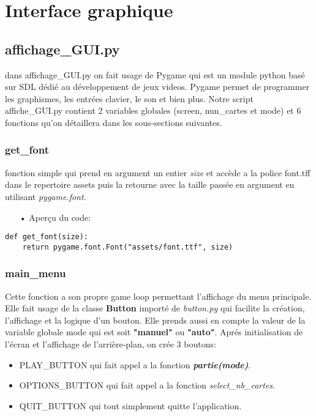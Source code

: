 \section{Interface graphique}
    \subsection{affichage\_GUI.py}
	dans affichage\_GUI.py on fait usage de Pygame qui est un module python basé sur SDL dédié au développement de jeux videos. Pygame permet de programmer les graphismes, les entrées clavier, le son et bien plus. Notre script affiche\_GUI.py contient 2 variables globales (screen, nun\_cartes et mode) et 6 fonctions qu'on détaillera dans les sous-sections suivantes.
	
	\subsubsection{get\_font}
	fonction simple qui prend en argument un entier \emph{size} et accède a la police font.tff dans le repertoire assets puis la retourne avec la taille passée en argument en utilisant \emph{pygame.font}.
	\\
	\begin{itemize}
	\color{blue}\item[•]Aperçu du code:
	\end{itemize}
	
	\lstset{language=Python}
	\lstset{frame=lines}
	\lstset{basicstyle=\footnotesize}
	\begin{lstlisting}
def get_font(size): 
    return pygame.font.Font("assets/font.ttf", size)
	\end{lstlisting}
	
	
	
	\subsubsection{main\_menu}
	Cette fonction a son propre game loop permettant l'affichage du menu principale. Elle fait usage de la classe \textbf{Button} importé de \emph{button.py} qui facilite la création, l'affichage et la logique d'un bouton. Elle prends aussi en compte la valeur de la variable globale mode qui est soit \textbf{"manuel"} ou \textbf{"auto"}. Aprés initialisation de l'écran et l'affichage de l'arrière-plan, on crée 3 boutons: 
	\begin{itemize}
	    \item PLAY\_BUTTON qui fait appel a la fonction \textbf{\emph{partie(mode)}}.
	    \item OPTIONS\_BUTTON qui fait appel a la fonction \emph{select\_nb\_cartes}.
	    \item QUIT\_BUTTON qui tout simplement quitte l'application.
	\end{itemize}
	
